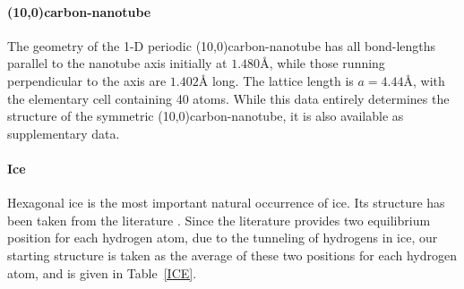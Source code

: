 \twolinestyle{\documentclass[prb,preprint]{revtex4}}
\begin{document}
\paragraph{(10,0)carbon-nanotube}
The geometry of the 1-D periodic (10,0)carbon-nanotube has 
all bond-lengths parallel to the nanotube axis initially at $1.480${\AA}, 
while those running perpendicular to the axis are $1.402${\AA} long.
The lattice length is $a=4.44${\AA}, with the elementary cell containing 
40 atoms. While this data entirely determines the structure of the symmetric 
(10,0)carbon-nanotube, it is also available as supplementary data.

\paragraph{Ice}
Hexagonal ice is the most important natural occurrence of ice.
Its structure has been taken from the literature \cite{AGoto90}. 
Since the literature provides two equilibrium position
for each hydrogen atom, due to the tunneling of hydrogens in ice,
our starting structure is taken as the average of these two positions
for each hydrogen atom, and is given in Table~\ref{ICE}.
\end{document}
